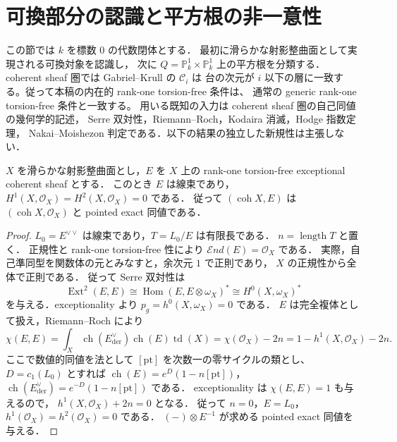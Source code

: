 \section{可換部分の認識と平方根の非一意性}
\label{sec:commutative-roots}

この節では $k$ を標数 $0$ の代数閉体とする．
最初に滑らかな射影整曲面として実現される可換対象を認識し，
次に $Q=\mathbb P^1_k\times\mathbb P^1_k$ 上の平方根を分類する．
coherent sheaf 圏では Gabriel--Krull の $\mathcal C_i$ は
台の次元が $i$ 以下の層に一致する。従って本稿の内在的 rank-one torsion-free 条件は、
通常の generic rank-one torsion-free 条件と一致する。
用いる既知の入力は coherent sheaf 圏の自己同値の幾何学的記述，
Serre 双対性，Riemann--Roch，Kodaira 消滅，Hodge 指数定理，
Nakai--Moishezon 判定である．以下の結果の独立した新規性は主張しない．

\begin{lemma}[滑らかな可換曲面の標識対象]
\label{lem:commutative-marking-line}
$X$ を滑らかな射影整曲面とし，$E$ を $X$ 上の rank-one torsion-free
exceptional coherent sheaf とする．
このとき $E$ は線束であり，$H^1(X,\mathcal O_X)=H^2(X,\mathcal O_X)=0$ である．
従って $(\operatorname{coh}X,E)$ は
$(\operatorname{coh}X,\mathcal O_X)$ と pointed exact 同値である．
\end{lemma}
\begin{proof}
$L_0=E^{\vee\vee}$ は線束であり，$T=L_0/E$ は有限長である．
$n=\operatorname{length}T$ と置く．
正規性と rank-one torsion-free 性により
$\mathcal{E}nd(E)=\mathcal O_X$ である．
実際，自己準同型を関数体の元とみなすと，余次元 $1$ で正則であり，
$X$ の正規性から全体で正則である．
従って Serre 双対性は
\[
 \operatorname{Ext}^2(E,E)
 \cong\operatorname{Hom}(E,E\otimes\omega_X)^*
 \cong H^0(X,\omega_X)^*
\]
を与える．exceptionality より $p_g=h^0(X,\omega_X)=0$ である．
$E$ は完全複体として扱え，Riemann--Roch により
\[
 \chi(E,E)
 =\int_X\operatorname{ch}(E^{\vee}_{\mathrm{der}})
             \operatorname{ch}(E)\operatorname{td}(X)
 =\chi(\mathcal O_X)-2n=1-h^1(X,\mathcal O_X)-2n.
\]
ここで数値的同値を法として $[\mathrm{pt}]$ を次数一の零サイクルの類とし、
$D=c_1(L_0)$ とすれば
$\operatorname{ch}(E)=e^D(1-n[\mathrm{pt}])$，
$\operatorname{ch}(E^{\vee}_{\mathrm{der}})=e^{-D}(1-n[\mathrm{pt}])$ である．
exceptionality は $\chi(E,E)=1$ も与えるので，
$h^1(X,\mathcal O_X)+2n=0$ となる．
従って $n=0$，$E=L_0$，$h^1(\mathcal O_X)=h^2(\mathcal O_X)=0$ である．
$(-)\otimes E^{-1}$ が求める pointed exact 同値を与える．
\end{proof}

